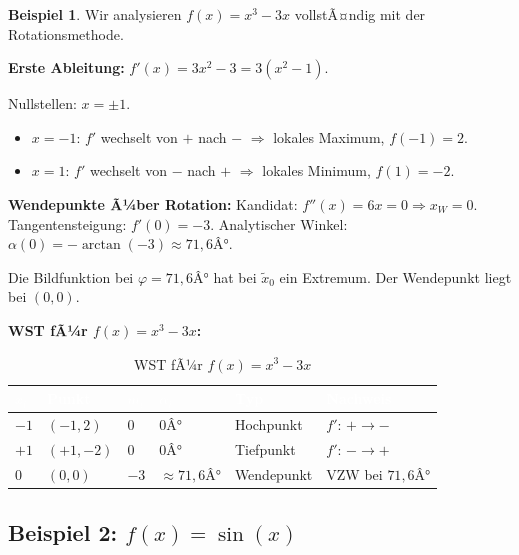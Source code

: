 ﻿\documentclass[12pt, a4paper]{article}
\theoremstyle{definition}
\newtheorem{beispiel}{Beispiel}[section]
\begin{document}
	\begin{beispiel}
		Wir analysieren $f(x) = x^3 - 3x$ vollstÃ¤ndig mit der Rotationsmethode.
		
		\textbf{Erste Ableitung:}
		$f'(x) = 3x^2 - 3 = 3(x^2 - 1)$.
		
		Nullstellen: $x = \pm 1$.
		\begin{itemize}
			\item $x = -1$: $f'$ wechselt von $+$ nach $-$ $\Rightarrow$ lokales Maximum, $f(-1) = 2$.
			\item $x = 1$: $f'$ wechselt von $-$ nach $+$ $\Rightarrow$ lokales Minimum, $f(1) = -2$.
		\end{itemize}
		
		\textbf{Wendepunkte Ã¼ber Rotation:}
		Kandidat: $f''(x) = 6x = 0 \Rightarrow x_W = 0$. Tangentensteigung: $f'(0) = -3$.
		Analytischer Winkel: $\alpha(0) = -\arctan(-3) \approx 71{,}6Â°$.
		
		Die Bildfunktion bei $\varphi = 71{,}6Â°$ hat bei $\tilde{x}_0$ ein Extremum.
		Der Wendepunkt liegt bei $(0, 0)$.
		
		\textbf{WST fÃ¼r $f(x) = x^3 - 3x$:}
		
		\begin{table}[H]
			\centering
			\renewcommand{\arraystretch}{1.4}
			\begin{tabular}{C{1.3cm} C{2.3cm} C{2.0cm} C{2.2cm} C{2.4cm} L{2.5cm}}
				\toprule
				\textcolor{white}{\textbf{$x_i$}} & \textcolor{white}{\textbf{Punkt}} &
				\textcolor{white}{\textbf{$m_i$}} & \textcolor{white}{\textbf{$\alpha_i$}} &
				\textcolor{white}{\textbf{Typ}} & \textcolor{white}{\textbf{Nachweis}} \\
				\midrule
				 $-1$ & $(-1, 2)$ & $0$ & $0Â°$ & Hochpunkt & $f'$: $+\to-$ \\
				 $+1$ & $(+1,-2)$ & $0$ & $0Â°$ & Tiefpunkt & $f'$: $-\to+$ \\
				 $0$ & $(0, 0)$ & $-3$ & $\approx 71{,}6Â°$ & Wendepunkt & VZW bei $71{,}6Â°$ \\
				\bottomrule
			\end{tabular}
			\caption{WST fÃ¼r $f(x) = x^3 - 3x$}
		\end{table}
	\end{beispiel}
	
	\subsection{Beispiel 2: $f(x) = \sin(x)$}
	
\end{document}
